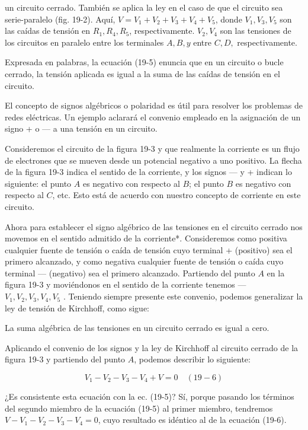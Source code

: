 \documentclass{article}
\begin{document}
un circuito cerrado. También se aplica la ley en el caso de que el circuito sea serie-paralelo (fig. 19-2). Aquí, \( V = V_1 + V_2 + V_3 + V_4 + V_5 \), donde \( V_1, V_3, V_5 \) son las caídas de tensión en \( R_1, R_4, R_5 \), respectivamente. \( V_2, V_4 \) son las tensiones de los circuitos en paralelo entre los terminales \( A, B, y \) entre \( C, D, \) respectivamente.

Expresada en palabras, la ecuación (19-5) enuncia que en un circuito o bucle cerrado, la tensión aplicada es igual a la suma de las caídas de tensión en el circuito.

El concepto de signos algébricos o polaridad es útil para resolver los problemas de redes eléctricas. Un ejemplo aclarará el convenio empleado en la asignación de un signo + o — a una tensión en un circuito.

Consideremos el circuito de la figura 19-3 y que realmente la corriente es un flujo de electrones que se mueven desde un potencial negativo a uno positivo. La flecha de la figura 19-3 indica el sentido de la corriente, y los signos — y + indican lo siguiente: el punto \( A \) es negativo con respecto al \( B \); el punto \( B \) es negativo con respecto al \( C \), etc. Esto está de acuerdo con nuestro concepto de corriente en este circuito.

Ahora para establecer el signo algébrico de las tensiones en el circuito cerrado nos movemos en el sentido admitido de la corriente*. Consideremos como positiva cualquier fuente de tensión o caída de tensión cuyo terminal + (positivo) sea el primero alcanzado, y como negativa cualquier fuente de tensión o caída cuyo terminal — (negativo) sea el primero alcanzado. Partiendo del punto \( A \) en la figura 19-3 y moviéndonos en el sentido de la corriente tenemos — \( V_1, V_2, V_3, V_4, V_5 \) . Teniendo siempre presente este convenio, podemos generalizar la ley de tensión de Kirchhoff, como sigue:

La suma algébrica de las tensiones en un circuito cerrado es igual a cero.

Aplicando el convenio de los signos y la ley de Kirchhoff al circuito cerrado de la figura 19-3 y partiendo del punto \( A \), podemos describir lo siguiente:

\[
V_1 - V_2 - V_3 - V_4 + V = 0 \quad (19-6)
\]

¿Es consistente esta ecuación con la ec. (19-5)? Sí, porque pasando los términos del segundo miembro de la ecuación (19-5) al primer miembro, tendremos \( V - V_1 - V_2 - V_3 - V_4 = 0 \), cuyo resultado es idéntico al de la ecuación (19-6).
\end{document}
